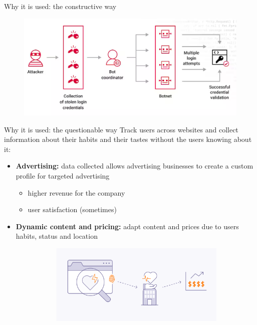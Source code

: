 \begin{frame}{Why it is used: the constructive way}
\begin{itemize}
          \begin{figure}
            \centering
            \includegraphics[width=0.6\linewidth]{images/botnet.png}
          \end{figure}
  \end{itemize}
\end{frame}

\begin{frame}{Why it is used: the questionable way}
  Track users across websites and collect information about their habits and their tastes without the users knowing about it:
  \begin{itemize}
    \item \textbf{Advertising:} data collected allows advertising businesses to create a custom profile for targeted advertising
          \begin{itemize}
            \item higher revenue for the company
            \item user satisfaction (sometimes)
          \end{itemize}
    \vspace{0.5cm}
    \item \textbf{Dynamic content and pricing:} adapt content and prices due to users habits, status and location
          \begin{figure}
            \centering
            \begin{subfigure}{0.45\textwidth}
              \includegraphics[width=\linewidth]{images/health.png}
            \end{subfigure}

\end{figure}
\end{itemize}
\end{frame}
